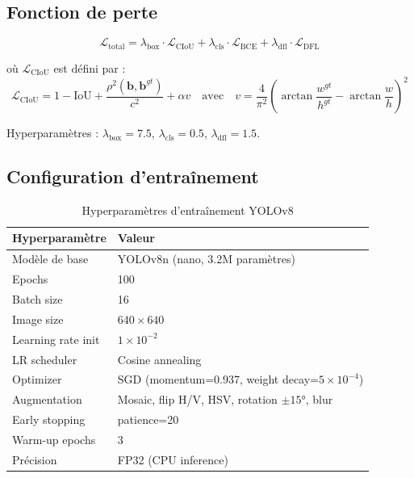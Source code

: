 \subsection{Fonction de perte}

\begin{equation}
\mathcal{L}_\text{total} = \lambda_\text{box}\cdot\mathcal{L}_\text{CIoU}
  + \lambda_\text{cls}\cdot\mathcal{L}_\text{BCE}
  + \lambda_\text{dfl}\cdot\mathcal{L}_\text{DFL}
\label{eq:yolo_loss}
\end{equation}

où $\mathcal{L}_\text{CIoU}$ est défini par :
\begin{equation}
\mathcal{L}_\text{CIoU} = 1 - \text{IoU} + \frac{\rho^2(\mathbf{b}, \mathbf{b}^{gt})}{c^2}
    + \alpha v
  \quad\text{avec}\quad
  v = \frac{4}{\pi^2}\left(\arctan\frac{w^{gt}}{h^{gt}} - \arctan\frac{w}{h}\right)^2
\label{eq:ciou}
\end{equation}

Hyperparamètres : $\lambda_\text{box} = 7.5$, $\lambda_\text{cls} = 0.5$, $\lambda_\text{dfl} = 1.5$.

\subsection{Configuration d'entraînement}

\begin{table}[H]
\centering
\caption{Hyperparamètres d'entraînement YOLOv8}
\label{tab:yolo_hp}
\begin{tabular}{ll}
\toprule
\textbf{Hyperparamètre} & \textbf{Valeur} \\
\midrule
Modèle de base      & YOLOv8n (nano, 3.2M paramètres) \\
Epochs              & 100 \\
Batch size          & 16 \\
Image size          & $640 \times 640$ \\
Learning rate init  & $1\times10^{-2}$ \\
LR scheduler        & Cosine annealing \\
Optimizer           & SGD (momentum=0.937, weight decay=$5\times10^{-4}$) \\
Augmentation        & Mosaic, flip H/V, HSV, rotation $\pm15°$, blur \\
Early stopping      & patience=20 \\
Warm-up epochs      & 3 \\
Précision           & FP32 (CPU inference) \\
\bottomrule
\end{tabular}
\end{table}

